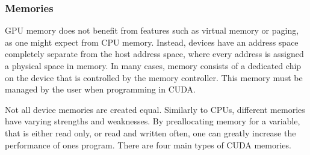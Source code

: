 \subsubsection{Memories}\label{sssec:memories}
GPU memory does not benefit from features such as virtual
memory or paging, as one might expect from CPU memory. Instead, devices have an
address space completely separate from the host address space, where every address is assigned a physical space in memory.
In many cases, memory consists of a dedicated chip on the device that is controlled
by the memory controller.  This memory must be managed by the user when programming in CUDA.
\par
Not all device memories are created equal.  Similarly to \Glspl{CPU},
different memories have varying strengths and weaknesses.  By preallocating memory for a variable,
that is either read only, or read and written often, one can greatly increase the
performance of ones program\cite{Wilt}.   %
There are four main types of CUDA memories.
